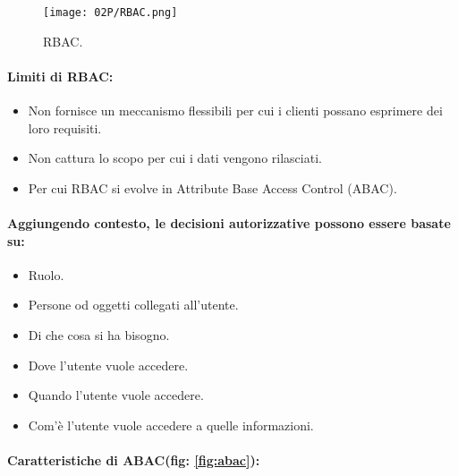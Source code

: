 \begin{figure}[h]
    \centering
    \texttt{[image: 02P/RBAC.png]}
    \caption{RBAC.}
    \label{fig:rbac}

  \end{figure}

\paragraph{Limiti di RBAC:}

\begin{itemize}
  \item Non fornisce un meccanismo flessibili per cui i clienti possano esprimere dei loro requisiti. 
  \item Non cattura lo scopo per cui i dati vengono rilasciati. 
  \item Per cui RBAC si evolve in Attribute Base Access Control (ABAC).
\end{itemize}

\paragraph{Aggiungendo contesto, le decisioni autorizzative possono essere basate su:}

\begin{itemize}
  \item Ruolo. 
  \item Persone od oggetti collegati all'utente. 
  \item Di che cosa si ha bisogno. 
  \item Dove l'utente vuole accedere. 
  \item Quando l'utente vuole accedere. 
  \item Com'è l'utente vuole accedere a quelle informazioni.
\end{itemize}



\paragraph{Caratteristiche di ABAC(fig: \ref{fig:abac}):}

